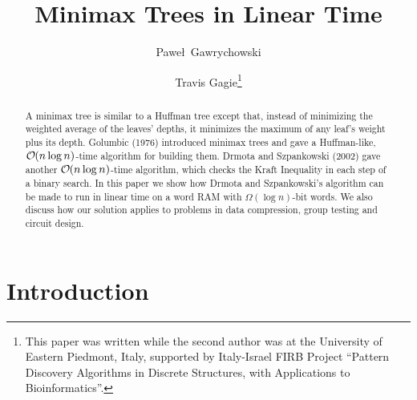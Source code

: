 \documentclass[runningheads]{llncs}
\newcommand{\Oh}[1]
    {\ensuremath{\mathcal{O} \hspace{-.5ex} \left( {#1} \right)}}
\begin{document}
\title{Minimax Trees in Linear Time}
\author{Pawe\l\ Gawrychowski
    \and Travis Gagie\fnmsep\thanks
    {This paper was written while the second author was at the University of Eastern Piedmont, Italy, supported by Italy-Israel FIRB Project ``Pattern Discovery Algorithms in Discrete Structures, with Applications to Bioinformatics''.}}
\maketitle

\begin{abstract}
A minimax tree is similar to a Huffman tree except that, instead of minimizing the weighted average of the leaves' depths, it minimizes the maximum of any leaf's weight plus its depth.  Golumbic (1976) introduced minimax trees and gave a Huffman-like, $\Oh{n \log n}$-time algorithm for building them.  Drmota and Szpankowski (2002) gave another $\Oh{n \log n}$-time algorithm, which checks the Kraft Inequality in each step of a binary search.  In this paper we show how Drmota and Szpankowski's algorithm can be made to run in linear time on a word RAM with \(\Omega (\log n)\)-bit words.  We also discuss how our solution applies to problems in data compression, group testing and circuit design.
\end{abstract}

\section{Introduction} \label{sec:intro}
\end{document}
